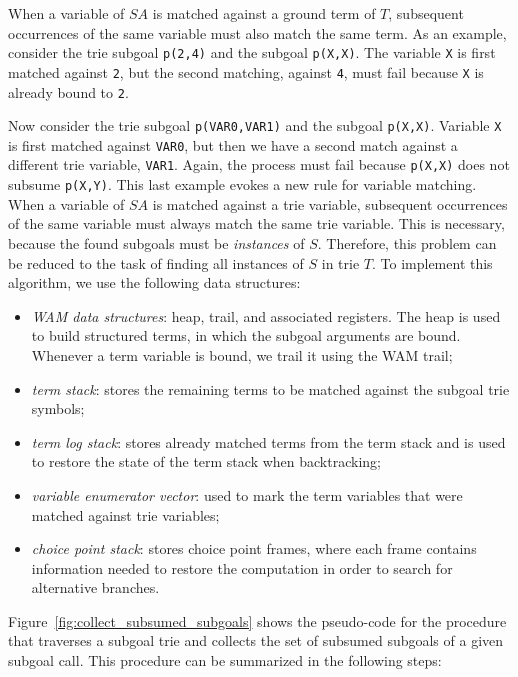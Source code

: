 When a variable of $SA$ is matched against a ground term of $T$,
subsequent occurrences of the same variable must also match the same
term. As an example, consider the trie subgoal \texttt{p(2,4)} and the
subgoal \texttt{p(X,X)}. The variable \texttt{X} is first matched against
\texttt{2}, but the second matching, against \texttt{4}, must fail because
\texttt{X} is already bound to \texttt{2}.

Now consider the trie subgoal \texttt{p(VAR0,VAR1)} and the subgoal
\texttt{p(X,X)}. Variable \texttt{X} is first matched against \texttt{VAR0}, but then we
have a second match against a different trie variable, \texttt{VAR1}. Again,
the process must fail because \texttt{p(X,X)} does not subsume \texttt{p(X,Y)}. This
last example evokes a new rule for variable matching. When a variable
of $SA$ is matched against a trie variable, subsequent occurrences of
the same variable must always match the same trie variable. This is
necessary, because the found subgoals must be \emph{instances} of
$S$. Therefore, this problem can be reduced to the task of finding all
instances of $S$ in trie $T$. To implement this algorithm, we use the
following data structures:

\begin{itemize}
\item \textit{WAM data structures}: heap, trail, and associated
  registers. The heap is used to build structured terms, in which the
  subgoal arguments are bound. Whenever a term
  variable is bound, we trail it using the WAM trail;
\item \textit{term stack}: stores the remaining terms to be matched
  against the subgoal trie symbols;
\item \textit{term log stack}: stores already matched terms from the
  term stack and is used to restore the state of the term stack when
  backtracking;
\item \textit{variable enumerator vector}: used to mark the term
  variables that were matched against trie variables;
\item \textit{choice point stack}: stores choice point frames, where
  each frame contains information needed to restore the computation in
  order to search for alternative branches.
\end{itemize}

Figure~\ref{fig:collect_subsumed_subgoals} shows the pseudo-code for
the procedure that traverses a subgoal trie and collects the set of
subsumed subgoals of a given subgoal call. This procedure can be
summarized in the following steps:

